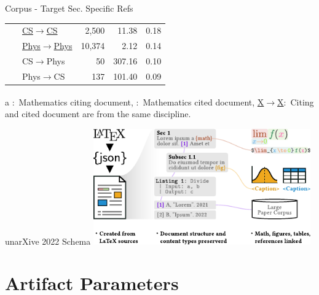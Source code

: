 \documentclass[en,16:9,smallfoot]{sdqbeamer}
\begin{document}
\begin{frame}{Corpus - Target Sec. Specific Refs}
\begin{table}
\begin{scriptsize}
\begin{threeparttable}
\begin{tabular}{llrrr}
       \ & \underline{CS$\rightarrow$CS} & 2,500 & 11.38 & 0.18 \\ %
       \ & \underline{Phys$\rightarrow$Phys} & 10,374 & 2.12 & 0.14 \\ %
       \ & CS$\rightarrow$Phys & 50 & 307.16 & 0.10 \\ %
       \ & Phys$\rightarrow$CS & 137 & 101.40 & 0.09  \\ %
      \bottomrule
    \end{tabular}
     \begin{tablenotes}
        \item[a] {\color{contextgrey}\textsuperscript{\textdagger}:~Mathematics citing document, \textsuperscript{\textdaggerdbl}:~Mathematics cited document, \underline{X$\rightarrow$X}:~Citing and cited document are from the same discipline.}
      \end{tablenotes}
     \end{threeparttable}
    \end{scriptsize}
    \end{table}
   \end{frame}

   \begin{frame}{unarXive 2022 Schema}
       \centering
       \includegraphics[width=0.7\textwidth]{imgs/unarXive_2022_schema}
   \end{frame}


\section{Artifact Parameters}
\end{document}
